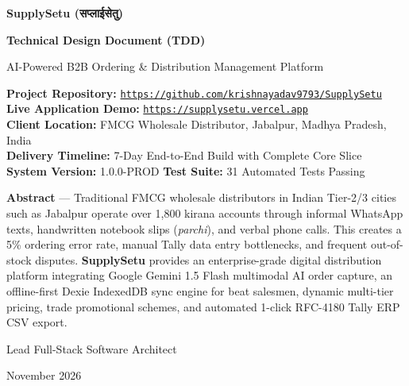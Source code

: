 \documentclass[11pt,a4paper]{article}
\begin{document}
\begin{titlepage}
    \centering
    \vspace*{1.5cm}
    
    {\Huge\bfseries\color{primary} SupplySetu (सप्लाईसेतु)\par}
    \vspace{0.4cm}
    {\Large\bfseries\color{secondary} Technical Design Document (TDD)\par}
    \vspace{0.2cm}
    {\large AI-Powered B2B Ordering \& Distribution Management Platform\par}
    \vspace{1.5cm}

    \begin{tcolorbox}[colback=codebg,colframe=primary,arc=3mm,width=0.92\textwidth]
        \centering
        \textbf{Project Repository:} \href{https://github.com/krishnayadav9793/SupplySetu}{\texttt{https://github.com/krishnayadav9793/SupplySetu}}\\[2mm]
        \textbf{Live Application Demo:} \href{https://supplysetu.vercel.app}{\texttt{https://supplysetu.vercel.app}}\\[2mm]
        \textbf{Client Location:} FMCG Wholesale Distributor, Jabalpur, Madhya Pradesh, India\\[2mm]
        \textbf{Delivery Timeline:} 7-Day End-to-End Build with Complete Core Slice\\[2mm]
        \textbf{System Version:} 1.0.0-PROD \quad\textbar\quad \textbf{Test Suite:} 31 Automated Tests Passing
    \end{tcolorbox}

    \vspace{2cm}

    \begin{minipage}{0.85\textwidth}
        \textbf{Abstract} --- Traditional FMCG wholesale distributors in Indian Tier-2/3 cities such as Jabalpur operate over 1,800 kirana accounts through informal WhatsApp texts, handwritten notebook slips (\textit{parchi}), and verbal phone calls. This creates a 5\% ordering error rate, manual Tally data entry bottlenecks, and frequent out-of-stock disputes. \textbf{SupplySetu} provides an enterprise-grade digital distribution platform integrating Google Gemini 1.5 Flash multimodal AI order capture, an offline-first Dexie IndexedDB sync engine for beat salesmen, dynamic multi-tier pricing, trade promotional schemes, and automated 1-click RFC-4180 Tally ERP CSV export.
    \end{minipage}

    \vfill
    {\large\color{secondary} Lead Full-Stack Software Architect\par}
    {\small November 2026\par}
\end{titlepage}
\end{document}
